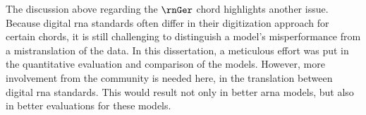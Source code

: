 The discussion above regarding the $\rnGer$ chord highlights
another issue. Because digital \gls{rna} standards often
differ in their digitization approach for certain chords, it
is still challenging to distinguish a model's misperformance
from a mistranslation of the data. In this dissertation, a
meticulous effort was put in the quantitative evaluation and
comparison of the models. However, more involvement from the
community is needed here, in the translation between digital
\gls{rna} standards. This would result not only in better
\gls{arna} models, but also in better evaluations for these
models.